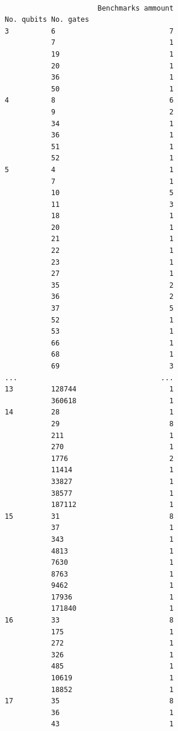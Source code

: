 \begin{itemize}
\begin{verbatim}

                      Benchmarks ammount
No. qubits No. gates
3          6                           7
           7                           1
           19                          1
           20                          1
           36                          1
           50                          1
4          8                           6
           9                           2
           34                          1
           36                          1
           51                          1
           52                          1
5          4                           1
           7                           1
           10                          5
           11                          3
           18                          1
           20                          1
           21                          1
           22                          1
           23                          1
           27                          1
           35                          2
           36                          2
           37                          5
           52                          1
           53                          1
           66                          1
           68                          1
           69                          3
...                                  ...
13         128744                      1
           360618                      1
14         28                          1
           29                          8
           211                         1
           270                         1
           1776                        2
           11414                       1
           33827                       1
           38577                       1
           187112                      1
15         31                          8
           37                          1
           343                         1
           4813                        1
           7630                        1
           8763                        1
           9462                        1
           17936                       1
           171840                      1
16         33                          8
           175                         1
           272                         1
           326                         1
           485                         1
           10619                       1
           18852                       1
17         35                          8
           36                          1
           43                          1


\end{verbatim}
\end{itemize}
